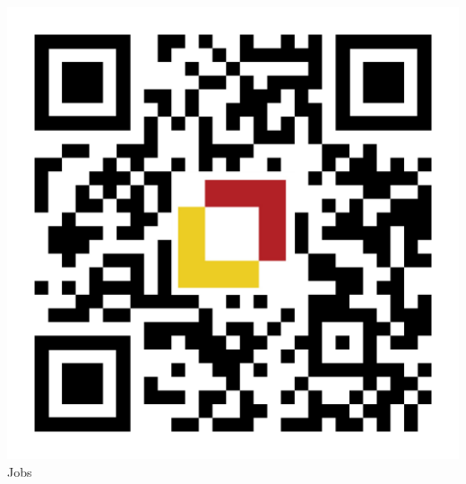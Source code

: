 \documentclass[aspectratio=169]{beamer}
\begin{document}
\begin{frame}
\begin{columns}
    \begin{column}{0.20\textwidth}
	\begin{center}	
		\bigskip
		\includegraphics[scale=0.1]{assets/qr-code.pdf}
		Jobs
	\end{center}
    \end{column}
\end{columns}

\end{frame}
\end{document}
